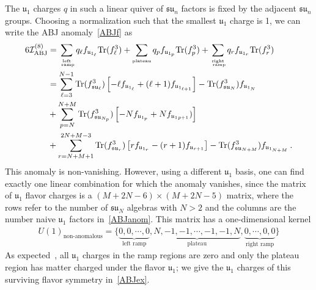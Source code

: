 \documentclass[11pt]{article}
\numberwithin{equation}{section}
\newcommand{\fu}{\mathfrak{u}}
\newcommand{\fsu}{\mathfrak{su}}
\begin{document}
The $\fu_1$ charges $q$ in such a linear quiver of $\mathfrak{su}_{n}$ factors is fixed by the adjacent $\mathfrak{su}_{n}$ groups. Choosing a normalization such that the smallest $\fu_1$ charge is 1, we can write the ABJ anomaly~\eqref{ABJf} as
\begin{align}
\label{ABJanom}
\begin{split}
6\mathcal{I}^{(8)}_\text{ABJ}&=
\sum_{\stackrel{\text{\tiny left}}{\text{ \tiny ramp}}}q_\ell f_{\fu_{1_\ell}}\text{Tr}(f^{3}_{\ell}) +
\sum_{\text{\tiny plateau}} q_p f_{\fu_{1_p}}\text{Tr}(f^{3}_{p}) +
\sum_{\stackrel{\text{\tiny right}}{\text{ \tiny ramp}}} q_r f_{\fu_{1_r}}\text{Tr}(f^{3}_{r})\\
&= \sum_{\ell=3}^{N-1} \text{Tr}(f^{3}_{\fsu_{\ell}})\left[-\ell f_{\fu_{1_\ell}}+(\ell+1) f_{\fu_{1_{\ell+1}}}\right] - \text{Tr}(f^{3}_{\mathfrak{su}_{N}}) f_{\fu_{1_N}} \\ 
&+ \sum_{p=N}^{N+M}\text{Tr}(f^{3}_{\fsu_{N_{p}}})\left[-N f_{\fu_{1_{p}}}+ N f_{\fu_1{_{p+1}}})\right] \\ 
&+ \sum_{r=N+M+1}^{2N+M-3} \text{Tr}(f^{3}_{\fsu_{r}})\left[r f_{\fu_{1_{r}}}-(r+1) f_{\fu_{{r+1}}}\right] - \text{Tr}(f^{3}_{\fsu_{N+M}}) f_{\fu_{1_{N+M}}} \, .\\ 
\end{split}
\end{align}
This anomaly is non-vanishing. However, using a different $\fu_1$ basis, one can find exactly one linear combination for which the anomaly vanishes, since the matrix of $\fu_1$ flavor charges is a $(M+2N-6) \times (M+2N-5)$ matrix, where the rows refer to the number of $\fsu_{N}$ algebras with $N>2$ and the columns are the number naive $\fu_1$ factors in~\eqref{ABJanom}. This matrix has a one-dimensional kernel
\begin{align}
U(1)_\text{non-anomalous}=\{\underbrace{0,0, \cdots, 0}_{\text{left ramp}}, \underbrace{N, -1,-1, \cdots ,-1,-1,N}_{\text{plateau}},\underbrace{0,\cdots,0,0}_{\text{right ramp}} \}
\end{align}
As expected~\cite{Fazzi:2020}, all $\fu_1$ charges in the ramp regions are zero and only the plateau region has matter charged under the flavor $\fu_1$; we give the $\fu_1$ charges of this surviving flavor symmetry in~\eqref{ABJex}.
\end{document}
